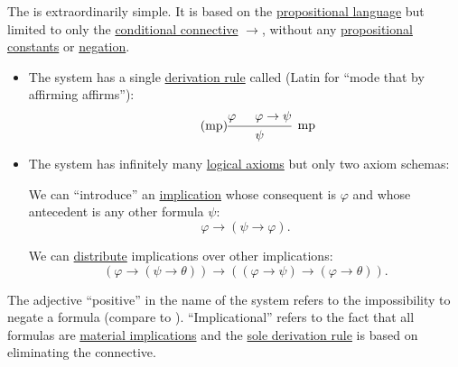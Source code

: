 \begin{definition}\label{def:positive_implicational_propositional_derivation_system}
  The  is extraordinarily simple. It is based on the \hyperref[def:propositional_language]{propositional language} but limited to only the \hyperref[def:propositional_language/connectives/conditional]{conditional connective} \( \rightarrow \), without any \hyperref[def:propositional_language/constants]{propositional constants} or \hyperref[def:propositional_language/negation]{negation}.

  \begin{itemize}
    \item The system has a single \hyperref[def:first_order_derivation_system/rules]{derivation rule} called  (Latin for \enquote{mode that by affirming affirms}):
    \begin{equation}\label{eq:def:implicational_logic/rules/modus_ponens}\tag{mp}
      \begin{prooftree}
        \hypo{\varphi}
        \hypo{\varphi \rightarrow \psi}
        \infer2[mp]{\psi}
      \end{prooftree}
    \end{equation}

    \item The system has infinitely many \hyperref[def:first_order_derivation_system/logical]{logical axioms} but only two axiom schemas:
    \begin{thmenum}
       We can \enquote{introduce} an \hyperref[def:material_implication]{implication} whose consequent is \( \varphi \) and whose antecedent is any other formula \( \psi \):
      \begin{equation}\label{eq:def:positive_implicational_propositional_derivation_system/axioms/imp_intro}
        \varphi \rightarrow (\psi \rightarrow \varphi).
      \end{equation}

       We can \hyperref[def:semiring/distributivity]{distribute} implications over other implications:
      \begin{equation}\label{eq:def:positive_implicational_propositional_derivation_system/axioms/imp_distr}
        (\varphi \rightarrow (\psi \rightarrow \theta)) \rightarrow ((\varphi \rightarrow \psi) \rightarrow (\varphi \rightarrow \theta)).
      \end{equation}
    \end{thmenum}
  \end{itemize}

  The adjective \enquote{positive} in the name of the system refers to the impossibility to negate a formula (compare to ). \enquote{Implicational} refers to the fact that all formulas are \hyperref[def:material_implication]{material implications} and the \hyperref[eq:def:implicational_logic/rules/modus_ponens]{sole derivation rule} is based on eliminating the connective.
\end{definition}

